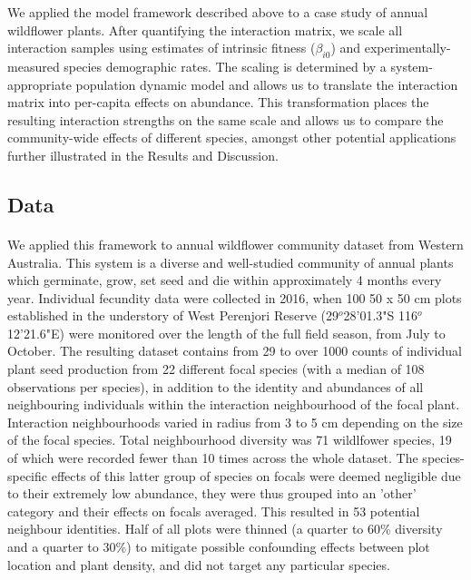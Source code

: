 \documentclass[a4,12pt]{article}
\begin{document}
        We applied the model framework described above to a case study of annual wildflower plants. After quantifying the interaction matrix, we scale all interaction samples using estimates of intrinsic fitness ($\beta_{i0}$) and experimentally-measured species demographic rates. The scaling is determined by a system-appropriate population dynamic model and allows us to translate the interaction matrix into per-capita effects on  abundance. This transformation places the resulting interaction strengths on the same scale and allows us to compare the community-wide effects of different species, amongst other potential applications further illustrated in the Results and Discussion. 


        \subsection{Data}

        \paragraph{}
        We applied this framework to annual wildflower community dataset from Western Australia. This system is a diverse and well-studied community of annual plants which germinate, grow, set seed and die within approximately 4 months every year. Individual fecundity data were collected in 2016, when 100 50 x 50 cm plots established in the understory of West Perenjori Reserve (29$^o$28'01.3"S 116$^o$12'21.6"E) were monitored over the length of the full field season, from July to October. The resulting dataset contains from 29 to over 1000 counts of individual plant seed production from 22 different focal species (with a median of 108 observations per species), in addition to the identity and abundances of all neighbouring individuals within the interaction neighbourhood of the focal plant. Interaction neighbourhoods varied in radius from 3 to 5 cm depending on the size of the focal species. Total neighbourhood diversity was 71 wildlfower species, 19 of which were recorded fewer than 10 times across the whole dataset. The species-specific effects of this latter group of species on focals were deemed negligible due to their extremely low abundance, they were thus grouped into an 'other' category and their effects on focals averaged. This resulted in 53 potential neighbour identities. Half of all plots were thinned (a quarter to 60\% diversity and a quarter to 30\%) to mitigate possible confounding effects between plot location and plant density, and did not target any particular species.
\end{document}
